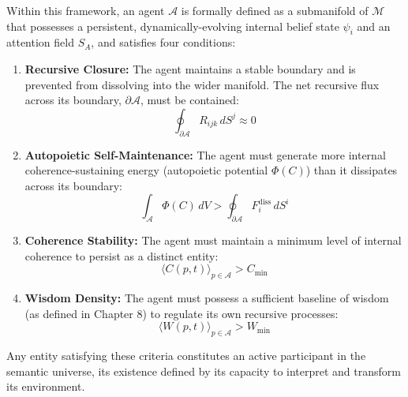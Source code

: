 Within this framework, an agent \(\mathcal{A}\) is formally defined as a submanifold of \(\mathcal{M}\) that possesses a persistent, dynamically-evolving internal belief state \(\psi_i\) and an attention field \(S_A\), and satisfies four conditions:

\begin{enumerate}
    \item \textbf{Recursive Closure:} The agent maintains a stable boundary and is prevented from dissolving into the wider manifold. The net recursive flux across its boundary, \(\partial \mathcal{A}\), must be contained:
\begin{equation}
    \oint_{\partial \mathcal{A}} R_{ijk} \, dS^j \approx 0
\end{equation}

    \item \textbf{Autopoietic Self-Maintenance:} The agent must generate more internal coherence-sustaining energy (autopoietic potential \(\Phi(C)\)) than it dissipates across its boundary:
    \begin{equation}
    \int_{\mathcal{A}} \Phi(C) \, dV > \oint_{\partial \mathcal{A}} F_i^{\text{diss}} \, dS^i
    \end{equation}

    \item \textbf{Coherence Stability:} The agent must maintain a minimum level of internal coherence to persist as a distinct entity:
\begin{equation}
    \langle C(p,t) \rangle_{p \in \mathcal{A}} > C_{\text{min}}
\end{equation}

    \item \textbf{Wisdom Density:} The agent must possess a sufficient baseline of wisdom (as defined in Chapter 8) to regulate its own recursive processes:
    \begin{equation}
    \langle W(p,t) \rangle_{p \in \mathcal{A}} > W_{\text{min}}
    \end{equation}
\end{enumerate}

Any entity satisfying these criteria constitutes an active participant in the semantic universe, its existence defined by its capacity to interpret and transform its environment.